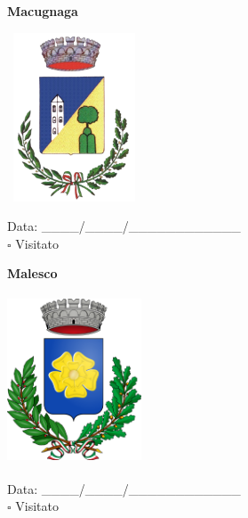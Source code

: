 \documentclass[a5paper,12pt]{article}
\begin{document}
\vspace{0.7cm}

\noindent
\begin{minipage}[t]{0.45\textwidth}
    \begin{center}
        \textbf{Macugnaga}
    \end{center}
    \vspace{-0.5cm} %
    \begin{center}
        \includegraphics[height= 5cm, width=4cm]{Piemonte/Stemma Macugnaga.png}
    \end{center}
    \vspace{-0.4cm} %
    \begin{flushleft}
        Data: \_\_\_\_/\_\_\_\_/\_\_\_\_\_\_\_\_\_\_\_\_ \\
        $\square$ Visitato
    \end{flushleft}
\end{minipage}
\hfill
\noindent
\begin{minipage}[t]{0.45\textwidth}
    \begin{center}
        \textbf{Malesco}
    \end{center}
    \vspace{-0.5cm} %
    \begin{center}
        \includegraphics[height= 5cm, width=4cm]{Piemonte/Stemma Malesco.png}
    \end{center}
    \vspace{-0.4cm} %
    \begin{flushleft}
        Data: \_\_\_\_/\_\_\_\_/\_\_\_\_\_\_\_\_\_\_\_\_ \\
        $\square$ Visitato
    \end{flushleft}
\end{minipage}
\hfill
\end{document}
